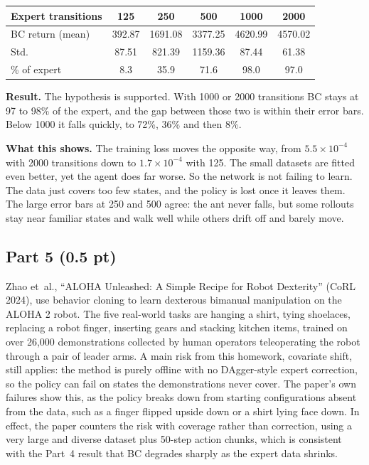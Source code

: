 \documentclass{article}
\begin{document}
\begin{center}
  \begin{tabular}{lccccc}
    \toprule
    Expert transitions & 125 & 250 & 500 & 1000 & 2000 \\
    \midrule
    BC return (mean) & 392.87 & 1691.08 & 3377.25 & 4620.99 & 4570.02 \\
    Std. & 87.51 & 821.39 & 1159.36 & 87.44 & 61.38 \\
    \% of expert & 8.3 & 35.9 & 71.6 & 98.0 & 97.0 \\
    \bottomrule
  \end{tabular}
\end{center}

\textbf{Result.} The hypothesis is supported. With 1000 or 2000 transitions BC stays at 97
to 98\% of the expert, and the gap between those two is within their error bars. Below 1000
it falls quickly, to 72\%, 36\% and then 8\%.

\textbf{What this shows.} The training loss moves the opposite way, from
$5.5\times10^{-4}$ with 2000 transitions down to $1.7\times10^{-4}$ with 125. The small
datasets are fitted even better, yet the agent does far worse. So the network is not
failing to learn. The data just covers too few states, and the policy is lost once it
leaves them. The large error bars at 250 and 500 agree: the ant never falls, but some
rollouts stay near familiar states and walk well while others drift off and barely move.

\subsection{Part 5 (0.5 pt)}

Zhao et~al., ``ALOHA Unleashed: A Simple Recipe for Robot Dexterity'' (CoRL 2024), use
behavior cloning to learn dexterous bimanual manipulation on the ALOHA 2 robot. The five
real-world tasks are hanging a shirt, tying shoelaces, replacing a robot finger, inserting
gears and stacking kitchen items, trained on over 26,000 demonstrations collected by human
operators teleoperating the robot through a pair of leader arms. A main risk from this
homework, covariate shift, still applies: the method is purely offline with no DAgger-style
expert correction, so the policy can fail on states the demonstrations never cover. The
paper's own failures show this, as the policy breaks down from starting configurations
absent from the data, such as a finger flipped upside down or a shirt lying face down. In
effect, the paper counters the risk with coverage rather than correction, using a very large
and diverse dataset plus 50-step action chunks, which is consistent with the Part~4 result
that BC degrades sharply as the expert data shrinks.
\end{document}
